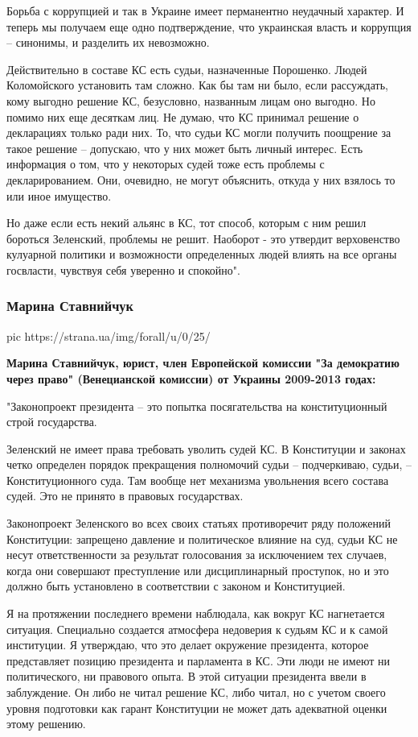 Борьба с коррупцией и так в Украине имеет перманентно неудачный характер. И
теперь мы получаем еще одно подтверждение, что украинская власть и коррупция –
синонимы, и разделить их невозможно.

Действительно в составе КС есть судьи, назначенные Порошенко. Людей
Коломойского установить там сложно. Как бы там ни было, если рассуждать, кому
выгодно решение КС, безусловно, названным лицам оно выгодно. Но помимо них еще
десяткам лиц. Не думаю, что КС принимал решение о декларациях только ради них.
То, что судьи КС могли получить поощрение за такое решение – допускаю, что у
них может быть личный интерес. Есть информация о том, что у некоторых судей
тоже есть проблемы с декларированием. Они, очевидно, не могут объяснить, откуда
у них взялось то или иное имущество.

Но даже если есть некий альянс в КС, тот способ, которым с ним решил бороться
Зеленский, проблемы не решит. Наоборот - это утвердит верховенство кулуарной
политики и возможности определенных людей влиять на все органы госвласти,
чувствуя себя уверенно и спокойно". 

\subsubsection{Марина Ставнийчук}

\ifcmt
	pic https://strana.ua/img/forall/u/0/25/%
\fi

\textbf{Марина Ставнийчук, юрист, член Европейской комиссии "За демократию через право"
(Венецианской комиссии) от Украины 2009-2013 годах:}

"Законопроект президента – это попытка посягательства на конституционный строй государства. 

Зеленский не имеет права требовать уволить судей КС. В Конституции и законах
четко определен порядок прекращения полномочий судьи – подчеркиваю, судьи, –
Конституционного суда. Там вообще нет механизма увольнения всего состава судей.
Это не принято в правовых государствах.

Законопроект Зеленского во всех своих статьях противоречит ряду положений
Конституции: запрещено давление и политическое влияние на суд, судьи КС не
несут ответственности за результат голосования за исключением тех случаев,
когда они совершают преступление или дисциплинарный проступок, но и это должно
быть установлено в соответствии с законом и Конституцией.

Я на протяжении последнего времени наблюдала, как вокруг КС нагнетается
ситуация. Специально создается атмосфера недоверия к судьям КС и к самой
институции. Я утверждаю, что это делает окружение президента, которое
представляет позицию президента и парламента в КС. Эти люди не имеют ни
политического, ни правового опыта. В этой ситуации президента ввели в
заблуждение. Он либо не читал решение КС, либо читал, но с учетом своего уровня
подготовки как гарант Конституции не может дать адекватной оценки этому
решению.

